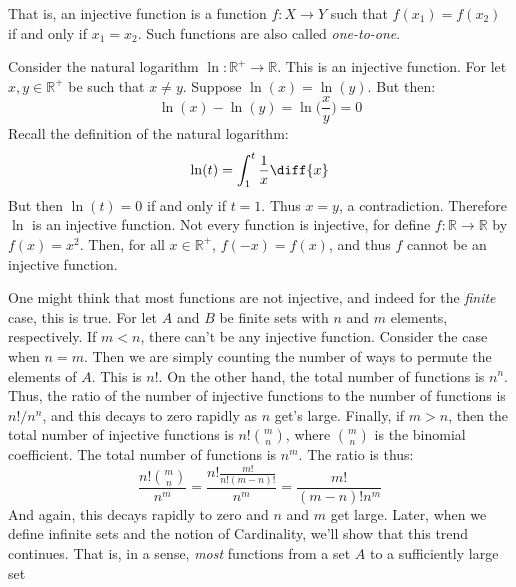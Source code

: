     That is, an injective function is a function $f:X\rightarrow{Y}$ such that
    $f(x_{1})=f(x_{2})$ if and only if $x_{1}=x_{2}$. Such functions are also
    called \textit{one-to-one}.
    \begin{example}
        Consider the natural logarithm
        $\ln:\mathbb{R}^{+}\rightarrow\mathbb{R}$. This is an injective
        function. For let $x,y\in\mathbb{R}^{+}$ be such that $x\ne{y}$.
        Suppose $\ln(x)=\ln(y)$. But then:
        \begin{equation}
            \ln(x)-\ln(y)=\ln\Big(\frac{x}{y}\Big)=0
        \end{equation}
        Recall the definition of the natural logarithm:
        \begin{equation}
            \ln(t)=\int_{1}^{t}\frac{1}{x}\diff{x}
        \end{equation}
        But then $\ln(t)=0$ if and only if $t=1$. Thus $x=y$, a contradiction.
        Therefore $\ln$ is an injective function. Not every function is
        injective, for define $f:\mathbb{R}\rightarrow\mathbb{R}$ by
        $f(x)=x^{2}$. Then, for all $x\in\mathbb{R}^{+}$, $f(\minus{x})=f(x)$,
        and thus $f$ cannot be an injective function.
    \end{example}
    One might think that most functions are not injective, and indeed for the
    \textit{finite} case, this is true. For let $A$ and $B$ be finite sets with
    $n$ and $m$ elements, respectively. If $m<n$, there can't be any injective
    function. Consider the case when $n=m$. Then we are simply counting the
    number of ways to permute the elements of $A$. This is $n!$. On the other
    hand, the total number of functions is $n^{n}$. Thus, the ratio of the
    number of injective functions to the number of functions is $n!/n^{n}$, and
    this decays to zero rapidly as $n$ get's large. Finally, if $m>n$, then the
    total number of injective functions is $n!\binom{m}{n}$, where
    $\binom{m}{n}$ is the binomial coefficient. The total number of functions is
    $n^{m}$. The ratio is thus:
    \begin{equation}
        \frac{n!\binom{m}{n}}{n^{m}}=\frac{n!\frac{m!}{n!(m-n)!}}{n^{m}}
                                    =\frac{m!}{(m-n)!n^{m}}
    \end{equation}
    And again, this decays rapidly to zero and $n$ and $m$
    get large. Later, when we define infinite sets
    and the notion of Cardinality, we'll show that this
    trend continues. That is, in a sense, \textit{most}
    functions from a set $A$ to a sufficiently large set
